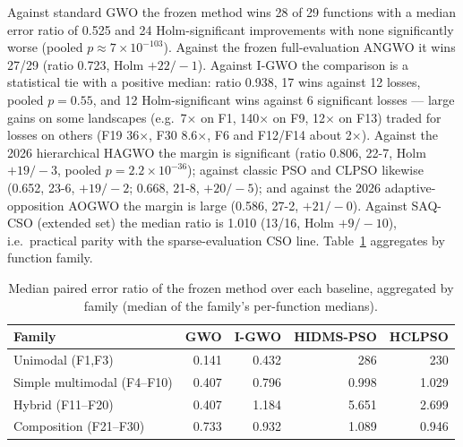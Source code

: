 \documentclass[journal]{IEEEtran}
\newcommand{\method}{VAST-GWO}
\begin{document}
\begin{table}[t]
\centering
\small
\caption{Final seven-method comparison (CEC2017, $D=50$, 100{,}000 true
evaluations, 29 functions, 30 runs, identical seeds). ``Med.\ ratio'' is the
median paired error ratio of \method{} over each baseline (below one favours
\method{}); ``W-L'' counts function-mean wins and losses; Holm counts
per-function significant wins/losses after Holm correction; ``Pooled $p$'' is
the paired Wilcoxon over all runs.}
\label{tab:main}
\resizebox{\columnwidth}{!}{}
\end{table}

Against standard GWO the frozen method wins 28 of 29 functions with a
median error ratio of 0.525 and 24 Holm-significant improvements with none
significantly worse (pooled $p\approx 7\times10^{-103}$). Against the frozen
full-evaluation ANGWO it wins 27/29 (ratio 0.723, Holm $+22/-1$). Against
I-GWO the comparison is a statistical tie with a positive median: ratio
0.938, 17 wins against 12 losses, pooled $p=0.55$, and 12 Holm-significant
wins against 6 significant losses --- large gains on some landscapes
(e.g.\ 7$\times$ on F1, 140$\times$ on F9, 12$\times$ on F13) traded for
losses on others (F19 36$\times$, F30 8.6$\times$, F6 and F12/F14 about
2$\times$). Against the 2026 hierarchical HAGWO the margin is significant (ratio 0.806,
22-7, Holm $+19/-3$, pooled $p=2.2\times10^{-36}$); against classic PSO and
CLPSO likewise (0.652, 23-6, $+19/-2$; 0.668, 21-8, $+20/-5$); and against
the 2026 adaptive-opposition AOGWO the margin is large (0.586, 27-2,
$+21/-0$). Against SAQ-CSO (extended set) the median ratio is 1.010 (13/16,
Holm $+9/-10$), i.e.\ practical parity with the sparse-evaluation CSO line.
Table~\ref{tab:family} aggregates by function family.

\begin{table}[t]
\centering
\caption{Median paired error ratio of the frozen method over each baseline,
aggregated by family (median of the family's per-function medians).}
\label{tab:family}
\begin{tabular}{lrrrr}
\toprule
Family & GWO & I-GWO & HIDMS-PSO & HCLPSO \\
\midrule
Unimodal (F1,F3) & 0.141 & 0.432 & 286 & 230 \\
Simple multimodal (F4--F10) & 0.407 & 0.796 & 0.998 & 1.029 \\
Hybrid (F11--F20) & 0.407 & 1.184 & 5.651 & 2.699 \\
Composition (F21--F30) & 0.733 & 0.932 & 1.089 & 0.946 \\
\bottomrule
\end{tabular}
\end{table}
\end{document}
